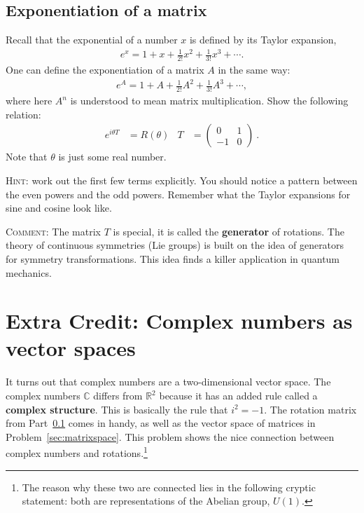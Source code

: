 \documentclass[12pt]{article}
\numberwithin{equation}{section}    %
\begin{document}
\subsection{Exponentiation of a matrix}\label{sec:exponentiation}

Recall that the exponential of a number $x$ is defined by its Taylor expansion,
\begin{align}
	e^{x} = 1 + x + \frac{1}{2!}x^2 + \frac{1}{3!} x^3 + \cdots .
\end{align}
One can define the exponentiation of a matrix $A$ in the same way:
\begin{align}
	e^{A} = 1 + A + \frac{1}{2!}A^2 + \frac{1}{3!} A^3 + \cdots ,
\end{align}
where here $A^n$ is understood to mean matrix multiplication. Show the following relation:
\begin{align}
	e^{i \theta T} &= R(\theta) 
	&
	T &= \begin{pmatrix}
		0 & 1 \\ -1 & 0
	\end{pmatrix}\ .
\end{align}
Note that $\theta$ is just some real number. 

\textsc{Hint}: work out the first few terms explicitly. You should notice a pattern between the even powers and the odd powers. Remember what the Taylor expansions for sine and cosine look like. 

\textsc{Comment}: The matrix $T$ is special, it is called the \textbf{generator} of rotations. The theory of continuous symmetries (Lie groups) is built on the idea of generators for symmetry transformations. This idea finds a killer application in quantum mechanics.









\appendix	

\section{Extra Credit: Complex numbers as vector spaces}

It turns out that complex numbers are a two-dimensional vector space. The complex numbers $\mathbb{C}$ differs from $\mathbb{R}^2$ because it has an added rule called a \textbf{complex structure}. This is basically the rule that $i^2 = -1$. The rotation matrix from Part~\ref{sec:exponentiation} comes in handy, as well as the vector space of matrices in Problem~\ref{sec:matrixspace}. This problem shows the nice connection between complex numbers and rotations.\footnote{The reason why these two are connected lies in the following cryptic statement: both are representations of the Abelian group, $U(1)$.} 
\end{document}
